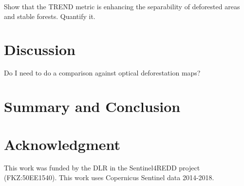\documentclass{article}
\begin{document}
Show that the TREND metric is enhancing the separability of deforested areas and stable forests.
Quantify it.

\section{Discussion}

Do I need to do a comparison against optical deforestation maps?

\section{Summary and Conclusion}



\section*{Acknowledgment}
This work was funded by the DLR in the Sentinel4REDD project (FKZ:50EE1540).
This work uses Copernicus Sentinel data 2014-2018.




\end{document}
